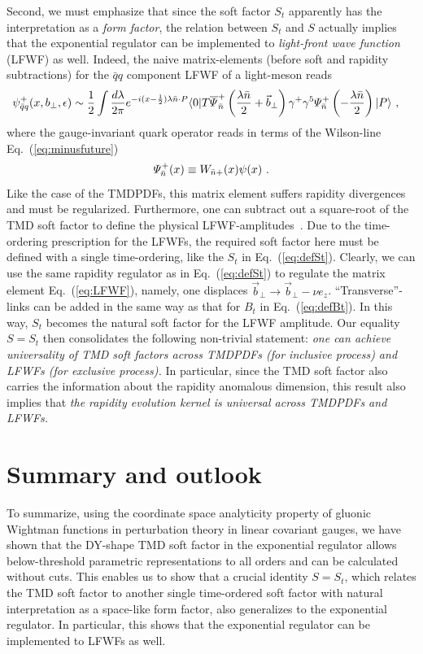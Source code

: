 \documentclass[a4paper,11pt]{article}
\begin{document}
Second, we must emphasize that since the soft factor $S_t$ apparently has the interpretation as a {\it form factor}, the relation between $S_t$ and $S$ actually implies that the exponential regulator can be implemented to {\it light-front wave function} (LFWF) as well. Indeed, the naive matrix-elements (before soft and rapidity subtractions) for the $\bar q q$ component LFWF of a light-meson reads~\cite{Collins:2018aqt,Ji:2021znw}
\begin{align}\label{eq:LFWF}
&\psi^{+}_{\bar q q}(x,b_\perp,\epsilon) \sim \frac{1}{2}\int \frac{d\lambda}{2\pi}{e^{-i(x-\frac{1}{2})\lambda \bar n \cdot P }} \langle 0|T\overline{\mit\Psi}_{\bar n}^{+}\left(\frac{\lambda \bar n}{2}+\vec{b}_\perp\right) \gamma^+ \gamma^5 {\mit\Psi}_{\bar n}^{+}\left(-\frac{\lambda \bar n}{2}\right) |P\rangle  \ , 
\end{align}
where the gauge-invariant quark operator reads in terms of the Wilson-line Eq.~(\ref{eq:minusfuture})
\begin{align}
{\mit\Psi}_{\bar n}^{+}(x)\equiv W_{\bar n+}(x)\psi(x) \ .
\end{align}
Like the case of the TMDPDFs, this matrix element suffers rapidity divergences and must be regularized. Furthermore, one can subtract out a square-root of the TMD soft factor to define the physical LFWF-amplitudes~\cite{Collins:2018aqt,Ji:2021znw}. Due to the time-ordering prescription for the LFWFs, the required soft factor here must be defined with a single time-ordering, like the $S_t$ in Eq.~(\ref{eq:defSt}). Clearly, we can use the same rapidity regulator as in Eq.~(\ref{eq:defSt}) to regulate the matrix element Eq.~(\ref{eq:LFWF}), namely, one displaces $\vec{b}_\perp \rightarrow \vec{b}_\perp -\nu e_z$. ``Transverse''-links can be added in the same way as that for $B_t$ in Eq.~(\ref{eq:defBt}). In this way, $S_t$ becomes the natural soft factor for the LFWF amplitude. Our equality $S=S_t$ then consolidates the following non-trivial statement: {\it one can achieve universality of TMD soft factors across TMDPDFs (for inclusive process) and LFWFs (for exclusive process). } In particular, since the TMD soft factor also carries the information about the rapidity anomalous dimension, this result also implies that {\it the rapidity evolution kernel is universal across TMDPDFs and LFWFs.}






\section{Summary and outlook}\label{sec:outlook}
To summarize, using the coordinate space analyticity property of gluonic Wightman functions in perturbation theory in linear covariant gauges, we have shown that the DY-shape TMD soft factor in the exponential regulator allows below-threshold parametric representations to all orders and can be calculated without cuts. This enables us to show that a crucial identity $S=S_t$, which relates the TMD soft factor to another single time-ordered soft factor with natural interpretation as a space-like form factor, also generalizes to the exponential regulator. In particular, this shows that the exponential regulator can be implemented to LFWFs as well. 
\end{document}
